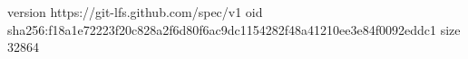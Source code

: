version https://git-lfs.github.com/spec/v1
oid sha256:f18a1e72223f20c828a2f6d80f6ac9dc1154282f48a41210ee3e84f0092eddc1
size 32864

